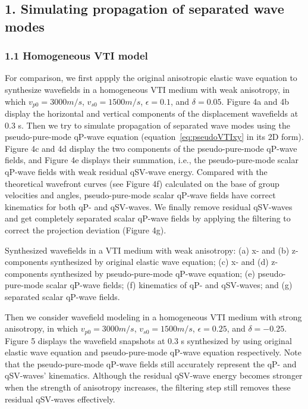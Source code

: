 \subsection{1. Simulating propagation of separated wave modes}

\subsubsection{1.1 Homogeneous VTI model}

For comparison, we first appply the original anisotropic elastic wave equation
 to synthesize wavefields in a homogeneous VTI medium with weak anisotropy, in which
$v_{p0}=3000 m/s$, $v_{s0}=1500 m/s$, $\epsilon=0.1$, and $\delta=0.05$. 
Figure 4a and 4b display the horizontal and vertical components of the displacement wavefields at 0.3 s.
 Then we try to simulate propagation of separated wave modes using the pseudo-pure-mode qP-wave equation 
(equation~\ref{eq:pseudoVTIxy} in its 2D form).
 Figure 4c and 4d display the two components of the pseudo-pure-mode qP-wave fields, and Figure 4e
 displays their summation, i.e., the pseudo-pure-mode scalar qP-wave fields with weak residual qSV-wave energy. 
 Compared with the theoretical wavefront curves (see Figure 4f) calculated
on the base of group velocities
 and angles, pseudo-pure-mode scalar qP-wave fields have correct kinematics for both qP- and qSV-waves.
We finally remove residual qSV-waves and get completely separated scalar qP-wave fields by 
 applying the filtering to correct the projection deviation (Figure 4g).

{
Synthesized wavefields in a VTI medium with weak anisotropy: (a) x- and
(b) z-components synthesized by original elastic wave equation; (c) x- and
 (d) z-components synthesized by pseudo-pure-mode qP-wave equation; (e) pseudo-pure-mode scalar qP-wave fields; 
(f) kinematics of qP- and qSV-waves; and (g) separated scalar qP-wave fields.
}


Then we consider wavefield modeling in a homogeneous VTI medium with strong anisotropy,
 in which $v_{p0}=3000 m/s$, $v_{s0}=1500 m/s$, $\epsilon=0.25$, and $\delta=-0.25$.
 Figure 5 displays the wavefield snapshots at 0.3 s synthesized by using original elastic wave equation
and pseudo-pure-mode qP-wave equation respectively. Note that the pseudo-pure-mode qP-wave fields still accurately
represent the qP- and qSV-waves' kinematics. Although the residual qSV-wave energy becomes stronger when
the strength of anisotropy increases, the filtering step still removes these residual qSV-waves effectively.

